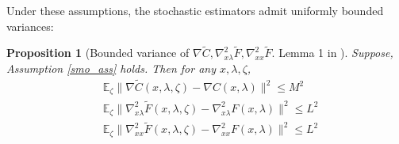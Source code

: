 \documentclass[11pt, twoside]{report}
\newtheorem{proposition}[theorem]{Proposition}
\begin{document}
Under these assumptions, the stochastic estimators admit uniformly bounded variances:
\begin{proposition}[Bounded variance of $\nabla \tilde{C}, \nabla_{x\lambda}^2 \tilde{F},\nabla_{xx}^2 \tilde{F}$. Lemma 1 in \cite{ji2021bilevel}] \label{boun_var}
    Suppose, Assumption \ref{smo_ass} holds. Then for any $x,\lambda,\zeta$,
    \begin{align*}
        &\mathbb{E}_\zeta \|\nabla \tilde{C}(x,\lambda,\zeta) - \nabla C(x,\lambda)\|^2 \leq M^2 \\
        &\mathbb{E}_\zeta \|\nabla_{x\lambda}^2 \tilde{F}(x,\lambda,\zeta) - \nabla_{x\lambda}^2 F(x,\lambda)\|^2 \leq L^2 \\
        &\mathbb{E}_\zeta \|\nabla_{xx}^2 \tilde{F}(x,\lambda,\zeta) - \nabla_{xx}^2 F(x,\lambda)\|^2 \leq L^2 
    \end{align*}
\end{proposition}
\end{document}
